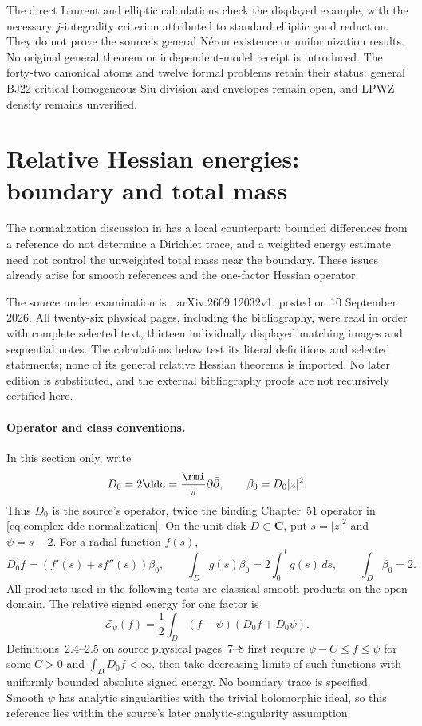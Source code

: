 The direct Laurent and elliptic calculations check the displayed
example, with the necessary $j$-integrality criterion attributed to
standard elliptic good reduction. They do not prove the source's
general N\'eron existence or uniformization results. No original
general theorem or independent-model receipt is introduced.
The forty-two canonical atoms and twelve formal problems retain their
status: general BJ22 critical homogeneous Siu division and envelopes
remain open, and LPWZ density remains unverified.

\section{Relative Hessian energies: boundary and total mass}
\label{sec:appL-relative-Hessian-boundary}

The normalization discussion in
 has a local counterpart:
bounded differences from a reference do not determine a Dirichlet trace,
and a weighted energy estimate need not control the unweighted total mass
near the boundary. These issues already arise for smooth references and
the one-factor Hessian operator.

The source under examination is
\cite{Truong26RelativeHessianV1}, arXiv:2609.12032v1, posted on
10 September 2026. All twenty-six physical pages, including the bibliography,
were read in order with complete selected text, thirteen individually
displayed matching images and sequential notes. The calculations below
test its literal definitions and selected statements; none of its general
relative Hessian theorems is imported. No later edition is substituted,
and the external bibliography proofs are not recursively certified here.

\paragraph{Operator and class conventions.}
In this section only, write
\[
 D_0=2\ddc=\frac{\rmi}{\pi}\partial\bar\partial,
 \qquad \beta_0=D_0|z|^2.
\]
Thus $D_0$ is the source's operator, twice the binding Chapter~51
operator in \eqref{eq:complex-ddc-normalization}.
On the unit disk $D\subset\mathbf C$, put $s=|z|^2$ and
$\psi=s-2$. For a radial function $f(s)$,
\[
 D_0f=(f'(s)+sf''(s))\beta_0,\qquad
 \int_Dg(s)\beta_0=2\int_0^1g(s)\,ds,\qquad
 \int_D\beta_0=2.
\]
All products used in the following tests are classical smooth products
on the open domain. The relative signed energy for one factor is
\[
 \mathcal E_\psi(f)=
 \frac12\int_D(f-\psi)(D_0f+D_0\psi).
\]
Definitions~2.4--2.5 on source physical pages~7--8 first require
$\psi-C\leq f\leq\psi$ for some $C>0$ and
$\int_DD_0f<\infty$, then take decreasing limits of such functions
with uniformly bounded absolute signed energy. No boundary trace is
specified. Smooth $\psi$ has analytic singularities with the trivial
holomorphic ideal, so this reference lies within the source's later
analytic-singularity assumption.

